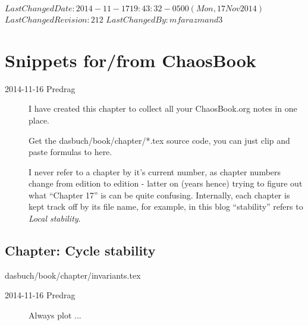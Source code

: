 {$LastChangedDate: 2014-11-17 19:43:32 -0500 (Mon, 17 Nov 2014) $}
{$LastChangedRevision: 212 $} {$LastChangedBy: mfarazmand3 $}

\chapter{Snippets for/from ChaosBook}
\label{chap:ChaosBook}

\begin{description}

\item[2014-11-16 Predrag] I have created this chapter to collect
    all your ChaosBook.org notes in one place.

Get the dasbuch/book/chapter/*.tex source
code, you can just clip and paste formulas to here.

I never refer to a chapter by it's current number,
as chapter numbers change from edition to edition - latter on (years
hence) trying to figure out what ``Chapter 17'' is can be quite
confusing. Internally, each chapter is kept track off by its file name,
for example, in this blog ``stability'' refers to   {\em
Local stability}.

\end{description}

\section{Chapter: Cycle stability}
\label{c-invariants}\noindent dasbuch/book/chapter/invariants.tex
\begin{description}

\item[2014-11-16 Predrag]
Always plot ...

\end{description}


